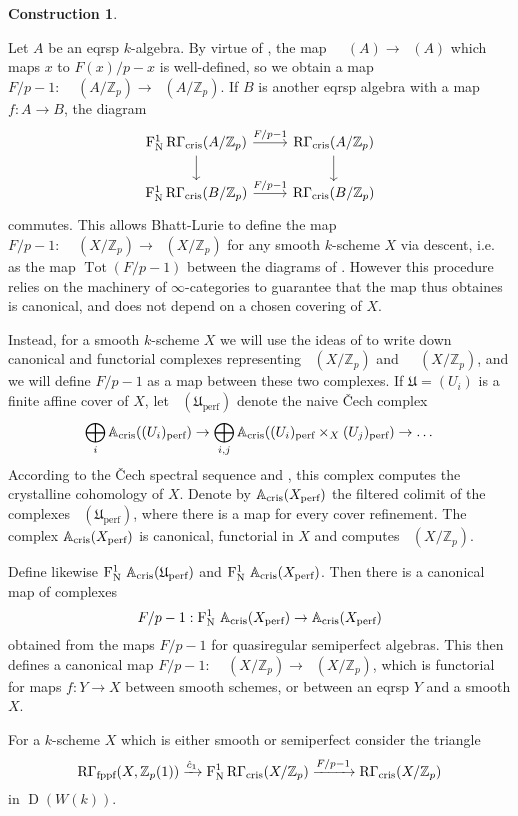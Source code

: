 \documentclass[11pt]{article}
\theoremstyle{plain}
\theoremstyle{definition}
\newtheorem{cons}[ThmS]{Construction}
\theoremstyle{remark}
\numberwithin{equation}{section}
\newcommand{\Zp}{\mathbb{Z}_p}
\newcommand\xto[2]{\xrightarrow[#1]{#2}}
\DeclareMathOperator{\D}{D}                                              %
\DeclareMathOperator{\Tot}{Tot}                                          %
\newcommand{\W}{W}                                                       %
\DeclareMathOperator{\Rflat}{R\Gamma_{\textnormal{fppf}}}                %
\DeclareMathOperator{\Acr}{\mathbb{A}_{cris}}                            %
\newcommand\coperf[1]{#1_{\textnormal{perf}}}                            %
\DeclareMathOperator{\Rcris}{R\Gamma_{cris}}                             %
\DeclareMathOperator{\Nyg}{F_N^1}                                      %
\begin{document}
\begin{cons}\label{costruzionsfsup}

Let $A$ be an eqrsp $k$-algebra. By virtue of , the map $\Nyg\Acr(A)\to\Acr(A)$ which maps $x$ to $F(x)/p-x$ is well-defined, so we obtain a map $F/p-1:\Nyg\Rcris(A/\Zp)\to\Rcris(A/\Zp)$. If $B$ is another eqrsp algebra with a map $f:A\to B$, the diagram 
\[\begin{tikzcd}
	{\Nyg\Rcris(A/\Zp)} & {\Rcris(A/\Zp)} \\
	{\Nyg\Rcris(B/\Zp)} & {\Rcris(B/\Zp)}
	\arrow["{F/p-1}", from=1-1, to=1-2]
	\arrow[from=1-1, to=2-1]
	\arrow[from=1-2, to=2-2]
	\arrow["{F/p-1}", from=2-1, to=2-2]
\end{tikzcd}\]commutes. This allows Bhatt-Lurie to define the map $F/p-1:\Nyg\Rcris(X/\Zp)\to\Rcris(X/\Zp)$ for any smooth $k$-scheme $X$ via descent, i.e. as the map $\Tot(F/p-1)$ between the diagrams of . However this procedure relies on the machinery of $\infty$-categories to guarantee that the map thus obtaines is canonical, and does not depend on a chosen covering of $X$.

Instead, for a smooth $k$-scheme $X$ we will use the ideas of  to write down canonical and functorial complexes representing $\Rcris(X/\Zp)$ and $\Nyg{}\Rcris(X/\Zp)$, and we will define $F/p-1$ as a map between these two complexes. If $\mathfrak{U}=(U_i)$ is a finite affine cover of $X$, let $\Acr(\mathfrak{U}_{\mathrm{perf}})$ denote the naive \v{C}ech complex 
\[
\bigoplus_i\Acr(\coperf{(U_i)})\to\bigoplus_{i,j}\Acr(\coperf{(U_i)}\times_X\coperf{(U_j)})\to\dots
\]
According to the \v{C}ech spectral sequence and , this complex computes the crystalline cohomology of $X$. Denote by $\Acr(\coperf{X})$ the filtered colimit of the complexes $\Acr(\mathfrak{U}_{\mathrm{perf}})$, where there is a map for every cover refinement. The complex $\Acr(\coperf{X})$ is canonical, functorial in $X$ and computes $\Rcris(X/\Zp)$. 

Define likewise $\Nyg{}\Acr(\coperf{\mathfrak{U}})$ and $\Nyg{}\Acr(\coperf{X})$. Then there is a canonical map of complexes
\[
F/p-1:\Nyg{}\Acr(\coperf{X})\to\Acr(\coperf{X})
\]
obtained from the maps $F/p-1$ for quasiregular semiperfect algebras. This then defines a canonical map $F/p-1:\Nyg{}\Rcris(X/\Zp)\to\Rcris(X/\Zp)$, which is functorial for maps $f:Y\to X$ between smooth schemes, or between an eqrsp $Y$ and a smooth $X$. 
\end{cons}

For a $k$-scheme $X$ which is either smooth or semiperfect consider the triangle
\begin{equation}\label{triangolo}
    \Rflat(X,\Zp(1))\xto{}{\hat{c}_1}\Nyg\Rcris(X/\Zp)\xto{}{F/p-1}\Rcris(X/\Zp)
\end{equation}
in $\D(\W(k))$.
\end{document}
